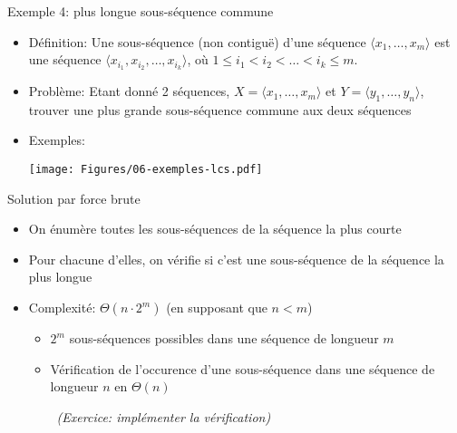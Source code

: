 \begin{frame}{Exemple 4: plus longue sous-séquence commune}

\begin{itemize}
\item Définition: Une \alert{sous-séquence} (non contiguë) d'une séquence $\langle x_1,\ldots,x_m\rangle$ est une séquence $\langle x_{i_1}, x_{i_2}, \ldots, x_{i_k}\rangle$, où $1\leq i_1 < i_2 < \ldots <i_k\leq m$.
\item Problème: Etant donné 2 séquences, $X=\langle
  x_1,\ldots,x_m\rangle$ et $Y=\langle y_1,\ldots,y_n\rangle$, trouver une plus grande sous-séquence commune aux deux séquences
\item Exemples:
\centerline{\texttt{[image: Figures/06-exemples-lcs.pdf]}}
\end{itemize}
\end{frame}

\begin{frame}{Solution par force brute}

\begin{itemize}
\item On énumère toutes les sous-séquences de la séquence la plus courte
\item Pour chacune d'elles, on vérifie si c'est une sous-séquence de la séquence la plus longue

\bigskip

\item Complexité: $\Theta(n\cdot 2^m)$ (en supposant que $n<m$)
\begin{itemize}
\item $2^m$ sous-séquences possibles dans une séquence de longueur $m$
\item Vérification de l'occurence d'une sous-séquence dans une
  séquence de longueur $n$ en $\Theta(n)$

\bigskip
~\hfill{\it (Exercice:
    implémenter la vérification)}
\end{itemize}
\end{itemize}

\end{frame}

